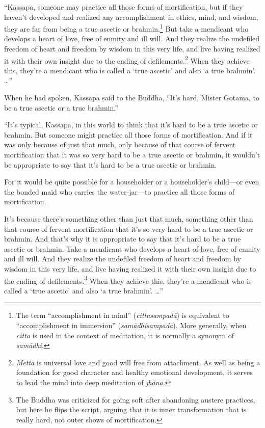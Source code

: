 \documentclass[12pt,openany]{book}%
\begin{document}
“Kassapa, someone may practice all those forms of mortification, but if they haven’t developed and realized any accomplishment in ethics, mind, and wisdom, they are far from being a true ascetic or brahmin.\footnote{The term “accomplishment in mind” (\textit{\textsanskrit{cittasampadā}}) is equivalent to “accomplishment in immersion” (\textit{\textsanskrit{samādhisampadā}}). More generally, when \textit{citta} is used in the context of meditation, it is normally a synonym of \textit{\textsanskrit{samādhi}}. } But take a mendicant who develops a heart of love, free of enmity and ill will. And they realize the undefiled freedom of heart and freedom by wisdom in this very life, and live having realized it with their own insight due to the ending of defilements.\footnote{\textit{\textsanskrit{Mettā}} is universal love and good will free from attachment. As well as being a foundation for good character and healthy emotional development, it serves to lead the mind into deep meditation of \textit{\textsanskrit{jhāna}}. } When they achieve this, they’re a mendicant who is called a ‘true ascetic’ and also ‘a true brahmin’. …” 

When he had spoken, Kassapa said to the Buddha, “It’s hard, Mister Gotama, to be a true ascetic or a true brahmin.” 

“It’s typical, Kassapa, in this world to think that it’s hard to be a true ascetic or brahmin. But someone might practice all those forms of mortification. And if it was only because of just that much, only because of that course of fervent mortification that it was so very hard to be a true ascetic or brahmin, it wouldn’t be appropriate to say that it’s hard to be a true ascetic or brahmin. 

For it would be quite possible for a householder or a householder’s child—or even the bonded maid who carries the water-jar—to practice all those forms of mortification. 

It’s because there’s something other than just that much, something other than that course of fervent mortification that it’s so very hard to be a true ascetic or brahmin. And that’s why it is appropriate to say that it’s hard to be a true ascetic or brahmin. Take a mendicant who develops a heart of love, free of enmity and ill will. And they realize the undefiled freedom of heart and freedom by wisdom in this very life, and live having realized it with their own insight due to the ending of defilements.\footnote{The Buddha was criticized for going soft after abandoning austere practices, but here he flips the script, arguing that it is inner transformation that is really hard, not outer shows of mortification. } When they achieve this, they’re a mendicant who is called a ‘true ascetic’ and also ‘a true brahmin’. …” 
\end{document}
